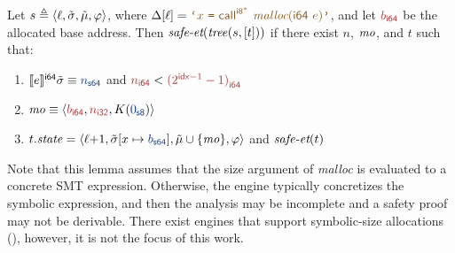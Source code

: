 {\begin{interfacelemma}
\label{lemma:interface-malloc}
Let $s \triangleq \langle{\ell},{\tilde\sigma},{\tilde{\mu}},{\varphi}\rangle$,
where \textup{$\instrat{\location} = \codequote{x~\texttt{=}~\tcall^{\pointertypeof{\bvsort{8}}}~\intrinsicfunc{malloc}(\bvsort{64} ~ e)}$},
and let $\bvval{\addr}{64}$ be the allocated base address.
Then $\textit{safe-et}(\mathit{tree}(s, [t]))$ if there exist $n$, $\mathit{mo}$, and $t$ such that:
\begin{enumerate}
    \item \textup{$\evalexprty{e}{\symlocalstore}{\bvsort{64}} \equiv \bvconst{64}{n}$} and \textup{$\bvval{n}{64} < \bvval{(2^{\indexwidth - 1} - 1)}{64}$}
    \item \textup{$\mo \equiv \mobj{\bvval{\addr}{64}}{\bvval{n}{32}}{\arrayconst{\arrayinitvalue}}$}
    \item \textup{$t.\attrstate = \symstate{\nextinstr{\location}}{\symlocalstore[x \mapsto \bvconst{64}{\addr}]}{\symstack}{\symmemory \cup \{\mo\}}{\pc}$} and $\textit{safe-et}(t)$
\end{enumerate}
\end{interfacelemma}

Note that this lemma assumes that the size argument of \textit{malloc} is evaluated to a concrete SMT expression.
Otherwise, the \SE engine typically concretizes the symbolic expression,
and then the analysis may be incomplete and a safety proof may not be derivable.
There exist \SE engines that support symbolic-size allocations (\eg \cite{uc-klee,symsize-model}),
however, it is not the focus of this work.
}

